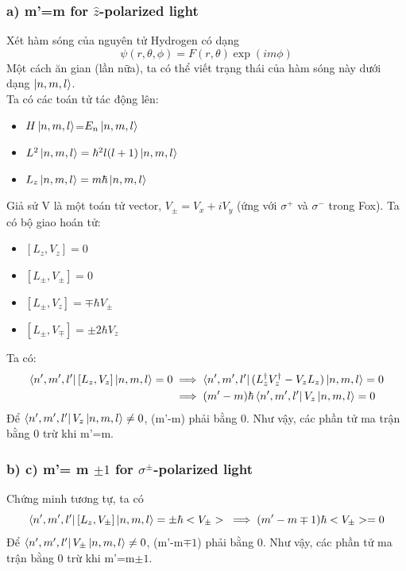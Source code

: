 \documentclass{article}
\begin{document}
\subsubsection*{a) m'=m for $\hat{z}$-polarized light}
Xét hàm sóng của nguyên tử Hydrogen có dạng $$\psi(r, \theta, \phi) = F(r, \theta) \exp(im\phi)$$
Một cách ăn gian (lần nữa), ta có thể viết trạng thái của hàm sóng này dưới dạng $\ket{n,m,l}$. \\
Ta có các toán tử tác động lên:
\begin{itemize}
	\item $H\ket{n,m,l}$=$E_n\ket{n,m,l}$
	\item $L^2\ket{n,m,l}=\hbar^2l(l+1)\ket{n,m,l}$
	\item $L_z\ket{n,m,l}=m\hbar\ket{n,m,l}$
\end{itemize}
Giả sử V là một toán tử vector,  $V_\pm=V_x+iV_y$ (ứng với $\sigma^+$ và $\sigma^-$ trong Fox).
Ta có bộ giao hoán tử:
\begin{itemize}
	\item $[L_z,V_z]=0$
	\item $[L_\pm,V_\pm]=0$
	\item  $[L_\pm,V_z]=\mp \hbar V_\pm$
	\item $[L_\pm,V_\mp]=\pm2\hbar V_z$
\end{itemize}
Ta có:
\begin{equation}
	\begin{split}
		\bra{n',m',l'}[L_z,V_z]\ket{n,m,l}=0
	&\implies	\bra{n',m',l'}(L_z^\dagger V_z^\dagger-V_zL_z)\ket{n,m,l}=0\\
	&\implies (m'-m)\hbar\bra{n',m',l'}V_z\ket{n,m,l}=0\\
	\end{split}
\end{equation}
Để $\bra{n',m',l'}V_z\ket{n,m,l}\neq 0$, (m'-m) phải bằng 0. Như vậy, các phần tử ma trận bằng 0 trừ khi m'=m.\\
\subsubsection*{b) c) m'= m $\pm1$ for $\sigma^\pm$-polarized light}
Chứng minh tương tự, ta có
\begin{equation}
	\bra{n',m',l'}[L_z,V_\pm]\ket{n,m,l}=\pm\hbar<V_\pm>\\
	\implies (m'-m\mp 1)\hbar<V_\pm>=0\\
\end{equation}
Để $\bra{n',m',l'}V_\pm\ket{n,m,l}\neq 0$, (m'-m$\mp1$) phải bằng 0. Như vậy, các phần tử ma trận bằng 0 trừ khi m'=m$\pm1$.\\
\end{document}
